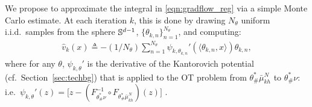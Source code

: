 We propose to approximate the integral in \eqref{eqn:gradflow_reg} via a simple Monte Carlo estimate.
% 
At each iteration $k$, this is done by drawing $N_\theta$ uniform i.i.d.\ samples from the sphere $\mathbb{S}^{d-1}$, $\{\theta_{k,n}\}_{n=1}^{N_\theta}$, and computing:
%
\begin{align}
\hat{v}_k(x) \triangleq - (1/{N_\theta}) \sum\nolimits_{n=1}^{N_\theta} \psi_{k, \theta_{k,n}}'(\langle\theta_{k,n},x\rangle ) \theta_{k,n}, \label{eqn:approxdrift}
\end{align}
%
where for any $\theta$, $\psi_{k, \theta}'$ is the derivative of the Kantorovich potential (cf.\ Section~\ref{sec:techbg}) that is applied to the OT problem from $\theta^*_\#\bar{\mu}_{kh}^{N}$ to $\theta^*_\#\nu$: i.e.\,
   $\psi_{k, \theta}'(z) = \bigl[ z - (F^{-1}_{\theta^*_\#\nu} \circ F_{\theta^*_\#\bar{\mu}_{kh}^{N}}) (z)  \bigr]$ .%

